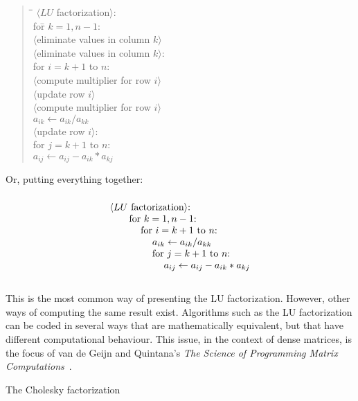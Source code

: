 \newcommand\macro[1]{$\langle$#1$\rangle$}
\begin{quote}
\medskip
\begin{tabbing}
  \kern20pt\=\kern10pt\=\kill
  \macro{$LU$ factorization}:\\
  \>for\={} $k=1,n-1$:\\
  \>\>\macro{eliminate values in column $k$}\\
  \macro{eliminate values in column $k$}:\\
  \>for $i=k+1$ to $n$:\\
  \>\>\macro{compute multiplier for row $i$}\\
  \>\>\macro{update row $i$}\\
  \macro{compute multiplier for row $i$}\\
  \> $a_{ik}\leftarrow a_{ik}/a_{kk}$\\
  \macro{update row $i$}:\\
  \>for $j=k+1$ to $n$:\\
  \>\>$a_{ij}\leftarrow a_{ij}-a_{ik}*a_{kj}$
\end{tabbing}
\end{quote}

Or, putting everything together:
\begin{equation}
 \vcenter{%
\begin{tabbing}
  \kern20pt\=\kern10pt\=\kern10pt\=\kern10pt\=\kill
  \macro{$LU$ factorization}:\\
  \>for\={} $k=1,n-1$:\\
  \>\>for\={} $i=k+1$ to $n$:\\
  \>\>\> $a_{ik}\leftarrow a_{ik}/a_{kk}$\\
  \>\>\>for\={} $j=k+1$ to $n$:\\
  \>\>\>\>$a_{ij}\leftarrow a_{ij}-a_{ik}*a_{kj}$
\end{tabbing}
  }
\label{eq:LU-algorithm}
\end{equation}

This is the most common way of presenting the LU
factorization. However, other ways of computing the same result
exist. Algorithms such as the LU factorization can be coded in several ways
that are mathematically equivalent, but that have different
computational behaviour. This issue, in the context of dense matrices,
is the focus of van de Geijn and Quintana's {\it The Science of
  Programming Matrix Computations}~\cite{TSoPMC}.

 {The Cholesky factorization}
\label{sec:cholesky}

